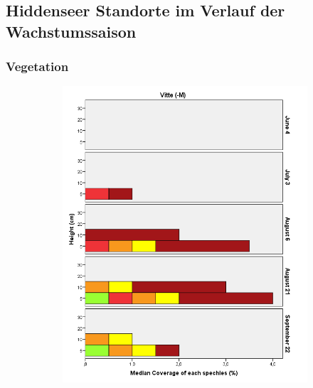 \subsection{Hiddenseer Standorte im Verlauf der Wachstumssaison}

\subsubsection{Vegetation}


\begin{figure}
        \centering
        \begin{subfigure}[b]{0.42\textwidth}
                \includegraphics[width=\textwidth]{images/wh_v_ohne_one}
        \end{subfigure}
        \begin{subfigure}[b]{0.57\textwidth}

\end{subfigure}
\end{figure}
